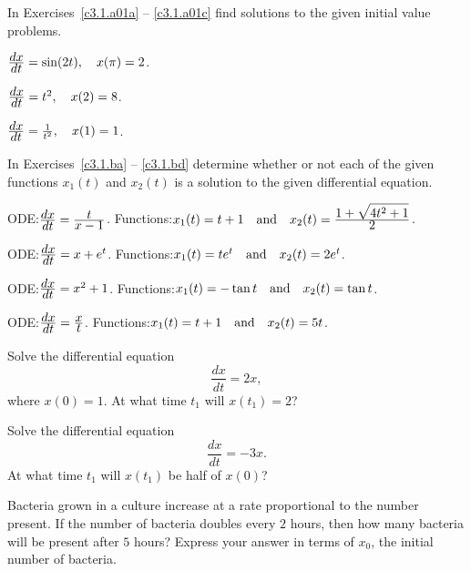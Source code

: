 \documentclass{ximera}
\begin{document}
\EXER

\TEXER


\noindent In Exercises~\ref{c3.1.a01a} -- \ref{c3.1.a01c} find
solutions to the given initial value problems.
\begin{exercise} \label{c3.1.a01a}
$\frac{\displaystyle dx}{\displaystyle dt} = \sin(2t),\quad x(\pi) = 2$.
\end{exercise}
\begin{exercise} \label{c3.1.a01b}
$\frac{\displaystyle dx}{\displaystyle dt} = t^2, \quad x(2) = 8$.
\end{exercise}
\begin{exercise} \label{c3.1.a01c}
$\frac{\displaystyle dx}{\displaystyle dt} = \frac{1}{t^2},\quad x(1)=1$.
\end{exercise}

\noindent In Exercises~\ref{c3.1.ba} -- \ref{c3.1.bd} determine whether
or not each of the given functions $x_1(t)$ and $x_2(t)$ is a solution 
to the given differential equation.
\begin{exercise}  \label{c3.1.ba}
ODE:\quad $\frac{\displaystyle dx}{\displaystyle dt} = \frac{\displaystyle t}{\displaystyle x-1}$.
Functions:\quad $x_1(t)=t+1 \quad\mbox{and}\quad x_2(t)= \frac{\displaystyle 1+\sqrt{4t^2+1}}{\displaystyle 2}$.
\end{exercise}
\begin{exercise}  \label{c3.1.bb}
ODE:\quad $\frac{\displaystyle dx}{\displaystyle dt} = x + e^t$.
Functions:\quad $x_1(t)=te^t \quad\mbox{and}\quad x_2(t)= 2e^t$.
\end{exercise}
\begin{exercise}  \label{c3.1.bc}
ODE:\quad $\frac{\displaystyle dx}{\displaystyle dt} = x^2 + 1$.
Functions:\quad $x_1(t)=-\tan t \quad\mbox{and}\quad x_2(t)= \tan t$.
\end{exercise}
\begin{exercise}  \label{c3.1.bd}
ODE:\quad $\frac{\displaystyle dx}{\displaystyle dt} = \frac{\displaystyle x}{\displaystyle t}$.
Functions:\quad $x_1(t)=t+1 \quad\mbox{and}\quad x_2(t)= 5t$.
\end{exercise}


\begin{exercise} \label{c3.1.1}
Solve the differential equation
\[
\frac{dx}{dt} = 2x,
\]
where $x(0)=1$.  At what time $t_1$ will $x(t_1)=2$?
\end{exercise}

\begin{exercise} \label{c3.1.2}
Solve the differential equation
\[
\frac{dx}{dt} = -3x.
\]
At what time $t_1$ will $x(t_1)$ be half of $x(0)$?
\end{exercise}

\begin{exercise} \label{c3.1.3}
Bacteria grown in a culture increase at a rate proportional to the
number present.  If the number of bacteria doubles every $2$ hours,
then how many bacteria will be pre\-sent af\-ter $5$ hours?  Express
your answer in terms of $x_0$, the initial number of bacteria.
\end{exercise}
\end{document}
